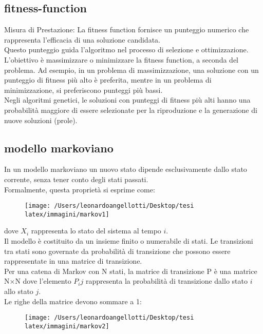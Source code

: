 \documentclass[a4paper,12pt]{report}
\begin{document}
\subsection{fitness-function}
Misura di Prestazione: La fitness function fornisce un punteggio numerico che rappresenta l'efficacia di una soluzione candidata. \\
Questo punteggio guida l'algoritmo nel processo di selezione e ottimizzazione. \\
L'obiettivo è massimizzare o minimizzare la fitness function, a seconda del problema. Ad esempio, in un problema di massimizzazione, una soluzione con un punteggio di fitness più alto è preferita, mentre in un problema di minimizzazione, si preferiscono punteggi più bassi. \\
Negli algoritmi genetici, le soluzioni con punteggi di fitness più alti hanno una probabilità maggiore di essere selezionate per la riproduzione e la generazione di nuove soluzioni (prole). \\

\subsection{modello markoviano}

In un modello markoviano un nuovo stato dipende esclusivamente dallo stato corrente, senza tener conto degli stati passati. \\
Formalmente, questa proprietà si esprime come: 

\begin{figure}[h!]
    \centering
    \texttt{[image: /Users/leonardoangellotti/Desktop/tesi latex/immagini/markov1]} 
    \label{fig:immagine}
\end{figure}

dove $X_i$ rappresenta lo stato del sistema al tempo $i$. \\
Il modello è costituito da un insieme finito o numerabile di stati. Le transizioni tra stati sono governate da probabilità di transizione che possono essere rappresentate in una matrice di transizione. \\
Per una catena di Markov con N stati, la matrice di transizione P è una matrice N×N dove l'elemento $P_ij$ rappresenta la probabilità di transizione dallo stato $i$ allo stato $j$. \\
Le righe della matrice devono sommare a 1: 

\begin{figure}[h!]
    \centering
    \texttt{[image: /Users/leonardoangellotti/Desktop/tesi latex/immagini/markov2]} 
    \label{fig:immagine}
\end{figure}
\end{document}
